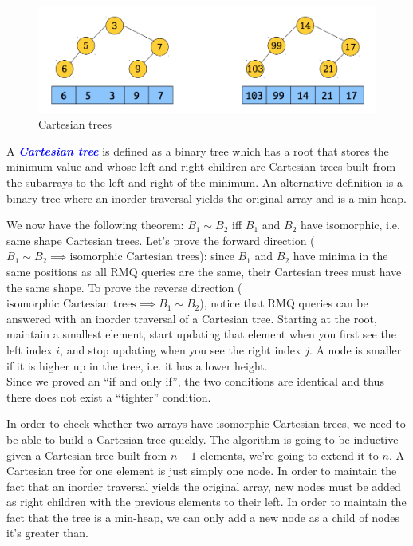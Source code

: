 \documentclass[11pt, oneside]{article}
\newcommand{\emphasis}[1]{\textcolor{blue}{\textbf{\textit{#1}}}}
\begin{document}
\begin{figure}[h!]
\centering
\includegraphics[scale=0.25]{cartesian}
\caption{Cartesian trees}
\end{figure}

A \emphasis{Cartesian tree} is defined as a binary tree which has a root that stores the minimum value and
whose left and right children are Cartesian trees built from the subarrays to the left
and right of the minimum. An alternative definition is a binary tree where an inorder traversal yields the original array
and is a min-heap.

We now have the following theorem: \( B_1 \sim B_2 \) iff \( B_1 \) and \( B_2 \)
have isomorphic, i.e. same shape Cartesian trees. Let's prove the forward direction
(\( B_1 \sim B_2 \implies \text{isomorphic Cartesian trees}\)): since \( B_1 \) and \( B_2 \)
have minima in the same positions as all RMQ queries are the same, their Cartesian trees must have
the same shape. To prove the reverse direction (\( \text{isomorphic Cartesian trees} \implies B_1 \sim B_2 \)),
notice that RMQ queries can be answered with an inorder traversal of a Cartesian tree.
Starting at the root, maintain a smallest element, start updating that element when you first see the
left index \( i \), and stop updating when you see the right index \( j \). A node is smaller if it is higher up
in the tree, i.e. it has a lower height. \\
Since we proved an ``if and only if'', the two conditions
are identical and thus there does not exist a ``tighter'' condition.

In order to check whether two arrays have isomorphic Cartesian trees, we need to be able to
build a Cartesian tree quickly. The algorithm is going to be inductive -
given a Cartesian tree built from \( n - 1 \) elements, we're going to extend it to \( n \).
A Cartesian tree for one element is just simply one node.
In order to maintain the fact that an inorder traversal yields the original array,
new nodes must be added as right children with the previous elements to their left.
In order to maintain the fact that the tree is a min-heap,
we can only add a new node as a child of nodes it's greater than.
\end{document}
